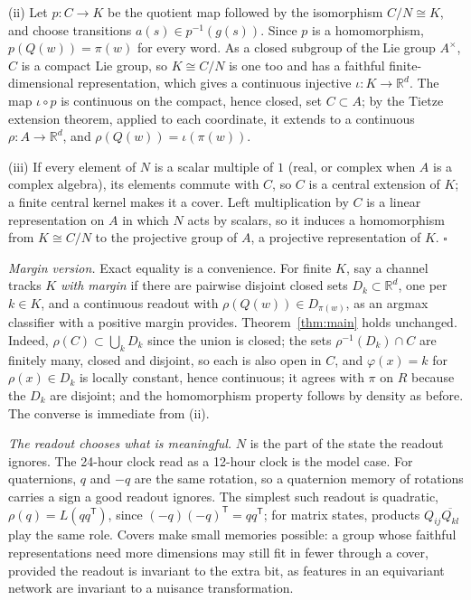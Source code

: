 \documentclass[aps,prx,reprint,superscriptaddress,longbibliography,nofootinbib,floatfix]{revtex4-2}
\newcommand{\RR}{\mathbb{R}}
\theoremstyle{plain}
\theoremstyle{definition}
\begin{document}
(ii) Let $p\colon C\to K$ be the quotient map followed by the isomorphism
$C/N\cong K$, and choose transitions $a(s)\in p^{-1}(g(s))$. Since $p$ is a
homomorphism, $p(Q(w))=\pi(w)$ for every word. As a closed subgroup of the
Lie group $A^\times$, $C$ is a compact Lie group, so $K\cong C/N$ is one
too and has a faithful finite-dimensional representation, which gives a
continuous injective $\iota\colon K\to\RR^d$. The map $\iota\circ p$ is
continuous on the compact, hence closed, set $C\subset A$; by the Tietze
extension theorem, applied to each coordinate, it extends to a continuous
$\rho\colon A\to\RR^d$, and $\rho(Q(w))=\iota(\pi(w))$.

(iii) If every element of $N$ is a scalar multiple of $1$ (real, or
complex when $A$ is a complex algebra), its elements commute with $C$, so
$C$ is a central extension of $K$; a finite central kernel makes it a cover.
Left multiplication by $C$ is a linear representation on $A$ in which $N$
acts by scalars, so it induces a homomorphism from $K\cong C/N$ to the
projective group of $A$, a projective representation of $K$. $\square$

\emph{Margin version.} Exact equality is a convenience. For finite $K$, say
a channel tracks $K$ \emph{with margin} if there are pairwise disjoint
closed sets $D_k\subset\RR^d$, one per $k\in K$, and a continuous readout
with $\rho(Q(w))\in D_{\pi(w)}$, as an argmax classifier with a positive
margin provides. Theorem~\ref{thm:main} holds unchanged. Indeed,
$\rho(C)\subset\bigcup_kD_k$ since the union is closed; the sets
$\rho^{-1}(D_k)\cap C$ are finitely many, closed and disjoint, so each is
also open in $C$, and $\varphi(x)=k$ for $\rho(x)\in D_k$ is locally
constant, hence continuous; it agrees with $\pi$ on $R$ because the $D_k$
are disjoint; and the homomorphism property follows by density as before.
The converse is immediate from (ii).

\emph{The readout chooses what is meaningful.} $N$ is the part of the state
the readout ignores. The 24-hour clock read as a 12-hour clock is the model
case. For quaternions, $q$ and $-q$ are the same rotation, so a quaternion
memory of rotations carries a sign a good readout ignores. The simplest such
readout is quadratic, $\rho(q)=L(qq^{\mathsf T})$, since
$(-q)(-q)^{\mathsf T}=qq^{\mathsf T}$; for matrix states, products
$Q_{ij}\overline{Q_{kl}}$ play the same role. Covers make small memories
possible: a group whose faithful representations need more dimensions may
still fit in fewer through a cover, provided the readout is invariant to
the extra bit, as features in an equivariant network are invariant to a
nuisance transformation.
\end{document}
